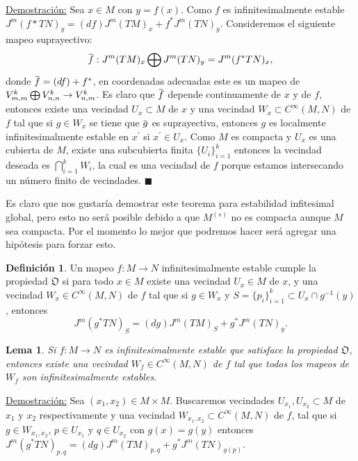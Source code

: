 \documentclass{report}
\newtheorem{lem}[theorem]{Lema}
\theoremstyle{definition}
\newtheorem{defi}[theorem]{Definici\'on}
\newcommand{\overbar}[1]{\mkern 1.5mu\overline{\mkern-1.5mu#1\mkern-1.5mu}\mkern 1.5mu}
\begin{document}
\underline{Demostraci\'on:} Sea $x \in M$ con $y = f(x)$. Como $f$ es infinitesimalmente estable $J^m (f\ast TN)_y = (df) J^m (TM)_x + f^\ast J^m (TN)_y$. Consideremos el siguiente mapeo suprayectivo:$$\overbar{f} :J^m (TM)_x \bigoplus J^m (TN)_y =J^m (f^\ast TN)_x ,$$
donde $\overbar{f} = (df) + f^\ast$, en coordenadas adecuadas este es un mapeo de $V^k_{m,m} \bigoplus V^k_{n,n} \\ \to V^k_{n,m}$. Es claro que $\overbar{f}$ depende continuamente de $x$ y de $f$, entonces existe una vecindad $U_x \subset M$ de $x $ y una vecindad $W_x \subset C^\infty (M,N)$ de $f$ tal que si $g \in W_x$ se tiene que  $\overbar{g}$ es suprayectiva, entonces $g$ es localmente infinitesimalmente estable en $x^\prime$ si $x^\prime \in U_x$. Como $M$ es compacta y $U_x$ es una cubierta de $M$, existe una subcubierta finita $\{U_i \}_{i=1}^k$ entonces la vecindad deseada es $\bigcap\limits_{i=1}^k W_i$, la cual es una vecindad de $f$ porque estamos intersecando un n\'umero finito de vecindades. $\blacksquare$

Es claro que nos gustar\'ia demostrar este teorema para estabilidad infitesimal global, pero esto no ser\'a posible debido a que $M^{(s)}$ no es compacta aunque $M$ sea compacta. Por el momento lo mejor que podremos hacer ser\'a agregar una hip\'otesis para forzar esto.

\begin{defi} 
Un mapeo $f:M \to N$ infinitesimalmente estable cumple la propiedad $\mathfrak{O}$ si para todo $x \in M$ existe una vecindad $U_x \in M$ de $x$, y una vecindad $W_x \in C^\infty(M,N)$ de $f$ tal que si $g \in W_x$ y $S= \{ p_i \}_{i =1}^k \subset U_x \cap g^{-1} (y)$, entonces $$J^m (g^\ast TN)_S = (dg) J^m (TM)_S + g^\ast J^m (TN)_y .$$

\end{defi}

\begin{lem}
Si $f: M \to N$ es infinitesimalmente estable que satisface la propiedad $\mathfrak{O}$, entonces existe una vecindad $W_f \in C^\infty (M,N)$ de $f$ tal que todos los mapeos de $W_f$ son infinitesimalmente estables.
\end{lem}

\underline{Demostraci\'on:} Sea $(x_1 , x_2) \in M \times M$. Buscaremos vecindades $U_{x_1}, U_{x_2} \subset M$ de $x_1$ y $x_2$ respectivamente y una vecindad $W_{x_1, x_2} \subset C^\infty (M,N)$ de $f$, tal que si $g \in W_{x_1, x_2}$, $p \in U_{x_1}$ y $q \in U_{x_2}$ con $g(x) = g(y)$ entonces $J^m (g^\ast TN)_{p,q} = (dg) J^m (TM)_{p,q} + g^\ast   J^m (TN)_{g(p)}$.
\end{document}
